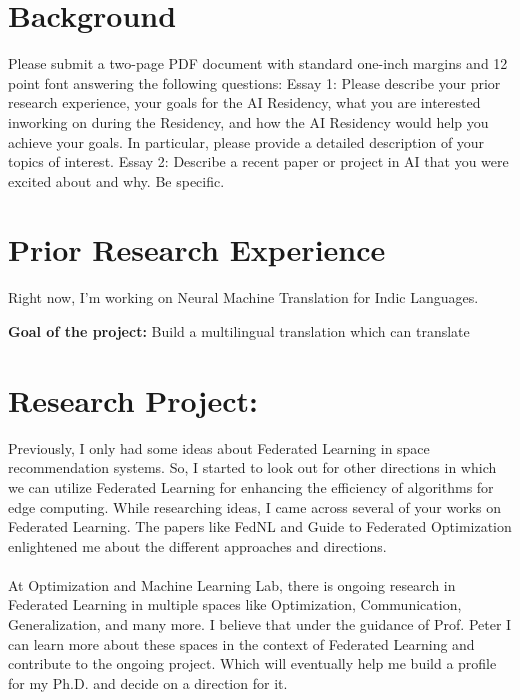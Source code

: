 \section*{Background}
Please submit a two-page PDF document with standard one-inch margins and 12 point font
answering the following questions: Essay 1: Please describe your prior research experience,
your goals for the AI Residency, what you are interested inworking on during the Residency,
and how the AI Residency would help you achieve your goals. In particular, please provide
a detailed description of your topics of interest. Essay 2: Describe a recent paper or project
in AI that you were excited about and why. Be specific.

\section*{Prior Research Experience}
Right now, I'm working on Neural Machine Translation for Indic Languages.

\textbf{Goal of the project:} Build a multilingual translation which can translate 

\section*{Research Project:}

Previously, I only had some ideas about Federated Learning in space recommendation systems. So, I started to look out for other directions in which we can utilize Federated Learning for enhancing the efficiency of algorithms for edge computing. While researching ideas, I came across several of your works on Federated Learning. The papers like FedNL and Guide to Federated Optimization enlightened me about the different approaches and directions. \\
\\
At Optimization and Machine Learning Lab, there is ongoing research in Federated Learning in multiple spaces like Optimization,
Communication, Generalization, and many more. I believe that under the guidance of Prof. Peter
I can learn more about these spaces in the context of Federated Learning and contribute
to the ongoing project. Which will eventually help me build a profile for my Ph.D. and
decide on a direction for it.